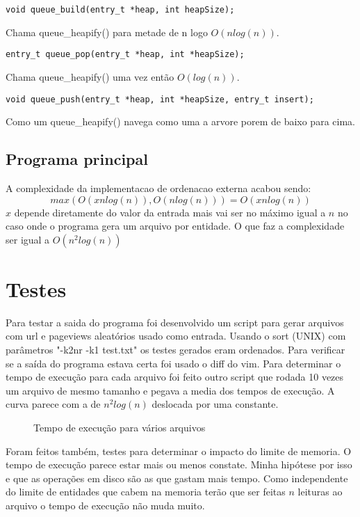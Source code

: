 \documentclass[a4paper, 11pt]{article}
\begin{document}
\begin{verbatim}
void queue_build(entry_t *heap, int heapSize);
\end{verbatim}
Chama queue\_heapify() para metade de n logo $O(nlog(n))$.

\begin{verbatim}
entry_t queue_pop(entry_t *heap, int *heapSize);
\end{verbatim}
Chama queue\_heapify() uma vez então $O(log(n))$.

\begin{verbatim}
void queue_push(entry_t *heap, int *heapSize, entry_t insert);
\end{verbatim}
Como um queue\_heapify() navega como uma a arvore porem de baixo para cima.

\subsection{Programa principal}
A complexidade da implementacao de ordenacao externa acabou sendo:
$$max(O(xnlog(n)), O(nlog(n))) = O(xnlog(n))$$
$x$ depende diretamente do valor da entrada mais vai ser no máximo igual a $n$ no caso onde o programa gera um arquivo por entidade. O que faz a complexidade ser igual a $O(n^2log(n))$

\section{Testes}
Para testar a saida do programa foi desenvolvido um script para gerar arquivos com url e pageviews aleatórios usado como entrada. Usando o sort (UNIX) com parâmetros "-k2nr -k1 test.txt" os testes gerados eram ordenados. Para verificar se a saída do programa estava certa foi usado o diff do vim. Para determinar o tempo de execução para cada arquivo foi feito outro script que rodada 10 vezes um arquivo de mesmo tamanho e pegava a media dos tempos de execução. A curva parece com a de $n^2log(n)$ deslocada por uma constante. 

\begin{figure}[!htb]
\begin{center}

\end{center}
\caption{Tempo de execução para vários arquivos}
\end{figure}

Foram feitos também, testes para determinar o impacto do limite de memoria. O tempo de execução parece estar mais ou menos constate. Minha hipótese por isso e que as operações em disco são as que gastam mais tempo. Como independente do limite de entidades que cabem na memoria terão que ser feitas $n$ leituras ao arquivo o tempo de execução não muda muito.
\end{document}
